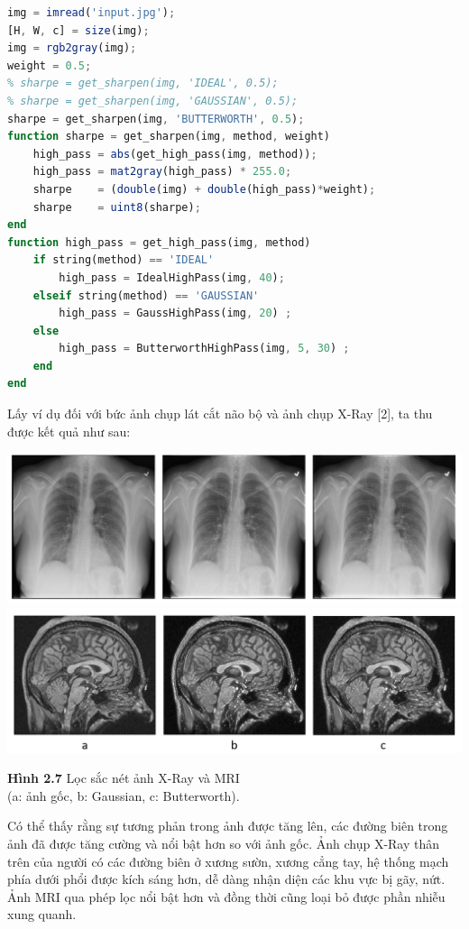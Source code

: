 \begin{lstlisting}[language=Octave]
img = imread('input.jpg');
[H, W, c] = size(img);
img = rgb2gray(img);
weight = 0.5;
% sharpe = get_sharpen(img, 'IDEAL', 0.5);
% sharpe = get_sharpen(img, 'GAUSSIAN', 0.5);
sharpe = get_sharpen(img, 'BUTTERWORTH', 0.5);
function sharpe = get_sharpen(img, method, weight)
    high_pass = abs(get_high_pass(img, method));
    high_pass = mat2gray(high_pass) * 255.0;
    sharpe    = (double(img) + double(high_pass)*weight);
    sharpe    = uint8(sharpe);
end
function high_pass = get_high_pass(img, method)
    if string(method) == 'IDEAL'
        high_pass = IdealHighPass(img, 40);
    elseif string(method) == 'GAUSSIAN'
        high_pass = GaussHighPass(img, 20) ;
    else
        high_pass = ButterworthHighPass(img, 5, 30) ;
    end
end
\end{lstlisting}
Lấy ví dụ đối với bức ảnh chụp lát cắt não bộ và ảnh chụp X-Ray [2], ta thu được kết quả như sau:
\begin{center}
    \includegraphics[scale=0.43]{Figures/fig14a.png}
    \includegraphics[scale=0.43]{Figures/fig14.png}
    \par \textbf {Hình 2.7} Lọc sắc nét ảnh X-Ray và MRI\\ (a: ảnh gốc, b: Gaussian, c: Butterworth).
\end{center}
Có thể thấy rằng sự tương phản trong ảnh được tăng lên, các đường biên trong ảnh đã được tăng cường và nổi bật hơn so với ảnh gốc. Ảnh chụp X-Ray thân trên của người có các đường biên ở xương sườn, xương cẳng tay, hệ thống mạch phía dưới phổi được kích sáng hơn, dễ dàng nhận diện các khu vực bị gãy, nứt. Ảnh MRI qua phép lọc nổi bật hơn và đồng thời cũng loại bỏ được phần nhiễu xung quanh.
